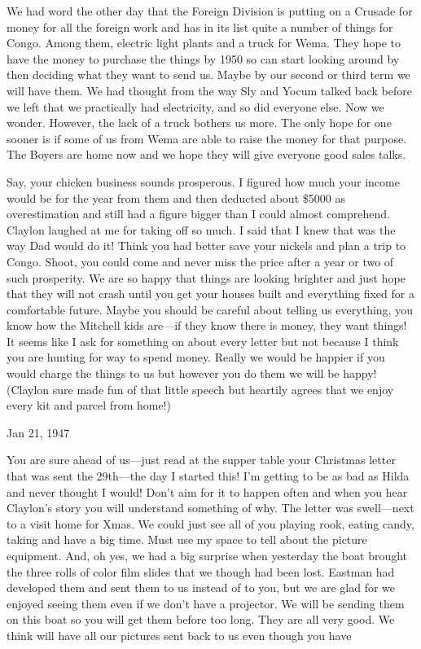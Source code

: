 \documentclass[
]{book}
\begin{document}
We had word the other day that the Foreign Division is putting on a Crusade for money for all the foreign work and has in its list quite a number of things for Congo. Among them, electric light plants and a truck for Wema. They hope to have the money to purchase the things by 1950 so can start looking around by then deciding what they want to send us. Maybe by our second or third term we will have them. We had thought from the way Sly and Yocum talked back before we left that we practically had electricity, and so did everyone else. Now we wonder. However, the lack of a truck bothers us more. The only hope for one sooner is if some of us from Wema are able to raise the money for that purpose. The Boyers are home now and we hope they will give everyone good sales talks.

Say, your chicken business sounds prosperous. I figured how much your income would be for the year from them and then deducted about \$5000 as overestimation and still had a figure bigger than I could almost comprehend. Claylon laughed at me for taking off so much. I said that I knew that was the way Dad would do it! Think you had better save your nickels and plan a trip to Congo. Shoot, you could come and never miss the price after a year or two of such prosperity. We are so happy that things are looking brighter and just hope that they will not crash until you get your houses built and everything fixed for a comfortable future. Maybe you should be careful about telling us everything, you know how the Mitchell kids are---if they know there is money, they want things! It seems like I ask for something on about every letter but not because I think you are hunting for way to spend money. Really we would be happier if you would charge the things to us but however you do them we will be happy! (Claylon sure made fun of that little speech but heartily agrees that we enjoy every kit and parcel from home!)

Jan 21, 1947

You are sure ahead of us---just read at the supper table your Christmas letter that was sent the 29th---the day I started this! I'm getting to be as bad as Hilda and never thought I would! Don't aim for it to happen often and when you hear Claylon's story you will understand something of why. The letter was swell---next to a visit home for Xmas. We could just see all of you playing rook, eating candy, taking and have a big time. Must use my space to tell about the picture equipment. And, oh yes, we had a big surprise when yesterday the boat brought the three rolls of color film slides that we though had been lost. Eastman had developed them and sent them to us instead of to you, but we are glad for we enjoyed seeing them even if we don't have a projector. We will be sending them on this boat so you will get them before too long. They are all very good. We think will have all our pictures sent back to us even though you have
\end{document}
